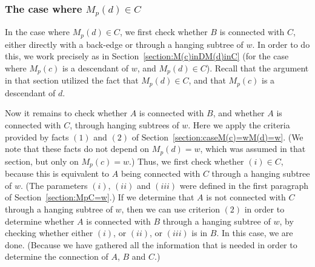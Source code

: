 \documentclass[11pt,a4paper]{article}
\begin{document}
\subsubsection{The case where $M_p(d)\in C$} 
\begin{comment}
In the case where $M_p(d)\in C$, the idea is to work similarly as in the previous case (where $M_p(d)=w$). Thus, we first check whether $C$ and $B$ are connected either directly with a back-edge or through a hanging subtree of $w$, and then we use the criteria $(1)$ and $(2)$ from Section~\ref{section:caseM(c)=wM(d)=w} in order to determine the connection between $A$ and $B$, and $A$ and $C$. The only difference here is that we have to use a different test for whether $C$ and $B$ are connected either directly with a back-edge or through a hanging subtree of $w$, because in Section~\ref{section:caseM(c)=wM(d)=w} we relied on the condition $M_p(d)=w$. In order to do that, here we utilize the fact that $M_p(d)\in C$, and we work exactly as in Section~\ref{section:M(c)inDM(d)inC} (for the case where $M_p(c)$ is a proper descendant of $w$, and $M_p(d)\in C$). Thus, it is sufficient to just  outline the argument of that section. First, we use either the leftmost or the rightmost point of $d$ (depending on which of those is not a descendant of $w$), in order to check if it provides a back-edge from $B_p(d)$ whose lower endpoint is different from $u$. Otherwise, we can easily use the leftmost and the rightmost points of $d$ \emph{that skip} $u$ on $T_\mathit{highDec}$, in order to determine whether $C$ and $B$ are connected either directly with a back-edge or through a hanging subtree of $w$. For more details, see the first paragraph of Section~\ref{section:M(c)inDM(d)inC}.
\end{comment}

In the case where $M_p(d)\in C$, we first check whether $B$ is connected with $C$, either directly with a back-edge or through a hanging subtree of $w$. In order to do this, we work precisely as in Section~\ref{section:M(c)inDM(d)inC} (for the case where $M_p(c)$ is a descendant of $w$, and $M_p(d)\in C$). Recall that the argument in that section utilized the fact that $M_p(d)\in C$, and that $M_p(c)$ is a descendant of $d$.

Now it remains to check whether $A$ is connected with $B$, and whether $A$ is connected with $C$, through hanging subtrees of $w$. Here we apply the criteria provided by facts $(1)$ and $(2)$ of Section~\ref{section:caseM(c)=wM(d)=w}. (We note that these facts do not depend on $M_p(d)=w$, which was assumed in that section, but only on $M_p(c)=w$.) Thus, we first check whether $(i)\in C$, because this is equivalent to $A$ being connected with $C$ through a hanging subtree of $w$. (The parameters $(i)$, $(ii)$ and $(iii)$ were defined in the first paragraph of Section~\ref{section:MpC=w}.) If we determine that $A$ is not connected with $C$ through a hanging subtree of $w$, then we can use criterion $(2)$ in order to determine whether $A$ is connected with $B$ through a hanging subtree of $w$, by checking whether either $(i)$, or $(ii)$, or $(iii)$ is in $B$. In this case, we are done. (Because we have gathered all the information that is needed in order to determine the connection of $A$, $B$ and $C$.) 
\end{document}
